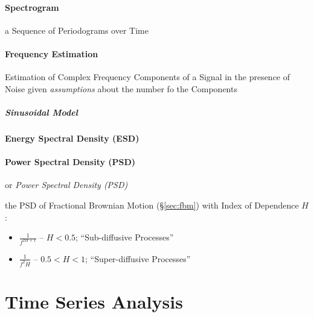 \paragraph{Spectrogram}\label{sec:spectrogram}\hfill

a Sequence of Periodograms over Time



\paragraph{Frequency Estimation}\label{sec:frequency_estimation}\hfill

Estimation of Complex Frequency Components of a Signal in the presence of Noise
given \emph{assumptions} about the number fo the Components



\subparagraph{Sinusoidal Model}\label{sec:sinusoidal_model}\hfill



\paragraph{Energy Spectral Density (ESD)}\label{sec:esd}\hfill

\paragraph{Power Spectral Density (PSD)}\label{sec:psd}\hfill

or \emph{Power Spectral Density (PSD)}

the PSD of Fractional Brownian Motion (\S\ref{sec:fbm}) with Index of Dependence
$H$:
\begin{itemize}
  \item $\frac{1}{f^{2H+1}}$ -- $H < 0.5$; ``Sub-diffusive Processes''
  \item $\frac{1}{f^2H}$ -- $0.5 < H < 1$; ``Super-diffusive Processes''
\end{itemize}



\section{Time Series Analysis}\label{sec:time_series_analysis}


